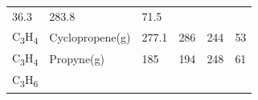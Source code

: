 \documentclass[
  9pt,
]{extbook}
\theoremstyle{definition}
\theoremstyle{definition}
\theoremstyle{definition}
\theoremstyle{remark}
\begin{document}
\begin{longtable}[]{@{}llllll@{}}
\begin{minipage}[t]{0.15\columnwidth}
36.3\strut
\end{minipage} & \begin{minipage}[t]{0.14\columnwidth}\raggedright
283.8\strut
\end{minipage} & \begin{minipage}[t]{0.14\columnwidth}\raggedright
71.5\strut
\end{minipage}\tabularnewline
\begin{minipage}[t]{0.07\columnwidth}\raggedright
C\textsubscript{3}H\textsubscript{4}\strut
\end{minipage} & \begin{minipage}[t]{0.17\columnwidth}\raggedright
Cyclopropene(g)\strut
\end{minipage} & \begin{minipage}[t]{0.15\columnwidth}\raggedright
277.1\strut
\end{minipage} & \begin{minipage}[t]{0.15\columnwidth}\raggedright
286\strut
\end{minipage} & \begin{minipage}[t]{0.14\columnwidth}\raggedright
244\strut
\end{minipage} & \begin{minipage}[t]{0.14\columnwidth}\raggedright
53\strut
\end{minipage}\tabularnewline
\begin{minipage}[t]{0.07\columnwidth}\raggedright
C\textsubscript{3}H\textsubscript{4}\strut
\end{minipage} & \begin{minipage}[t]{0.17\columnwidth}\raggedright
Propyne(g)\strut
\end{minipage} & \begin{minipage}[t]{0.15\columnwidth}\raggedright
185\strut
\end{minipage} & \begin{minipage}[t]{0.15\columnwidth}\raggedright
194\strut
\end{minipage} & \begin{minipage}[t]{0.14\columnwidth}\raggedright
248\strut
\end{minipage} & \begin{minipage}[t]{0.14\columnwidth}\raggedright
61\strut
\end{minipage}\tabularnewline
\begin{minipage}[t]{0.07\columnwidth}\raggedright
C\textsubscript{3}H\textsubscript{6}\strut
\end{minipage} & \begin{minipage}[t]{0.17\columnwidth}\raggedright

\end{minipage}
\end{longtable}
\end{document}

